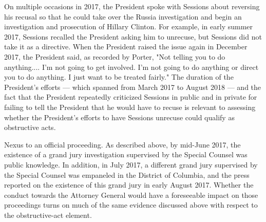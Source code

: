 On multiple occasions in 2017, the President spoke with Sessions about reversing his recusal so that he could take over the Russia investigation and begin an investigation and prosecution of Hillary Clinton.
For example, in early summer 2017, Sessions recalled the President asking him to unrecuse, but Sessions did not take it as a directive.
When the President raised the issue again in December 2017, the President said, as recorded by Porter, "Not telling you to do anything....
I'm not going to get involved.
I'm not going to do anything or direct you to do anything.
I just want to be treated fairly."
The duration of the President's efforts — which spanned from March 2017 to August 2018 — and the fact that the President repeatedly criticized Sessions in public and in private for failing to tell the President that he would have to recuse is relevant to assessing whether the President's efforts to have Sessions unrecuse could qualify as obstructive acts.

Nexus to an official proceeding.
As described above, by mid-June 2017, the existence of a grand jury investigation supervised by the Special Counsel was public knowledge.
In addition, in July 2017, a different grand jury supervised by the Special Counsel was empaneled in the District of Columbia, and the press reported on the existence of this grand jury in early August 2017.%
Whether the conduct towards the Attorney General would have a foreseeable impact on those proceedings turns on much of the same evidence discussed above with respect to the obstructive-act element.

